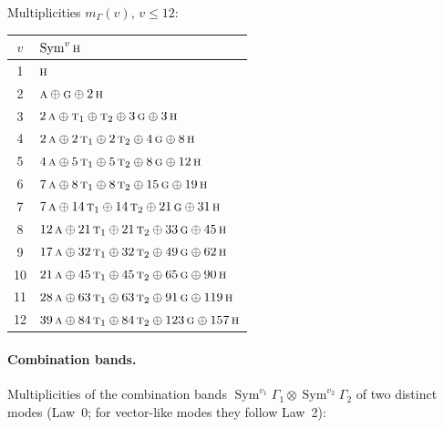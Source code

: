 \documentclass[11pt]{article}
\newcommand{\irr}[1]{\text{\normalfont\scshape #1}}
\begin{document}
Multiplicities $m_\Gamma(v)$, $v\le12$:
\begin{longtable}{c l}\hline $v$ & $\operatorname{Sym}^{v}\irr{h}$\\ \hline\endhead
1 & $\irr{h}$\\
2 & $\irr{a}\oplus \irr{g}\oplus 2\,\irr{h}$\\
3 & $2\,\irr{a}\oplus \irr{t}_{1}\oplus \irr{t}_{2}\oplus 3\,\irr{g}\oplus 3\,\irr{h}$\\
4 & $2\,\irr{a}\oplus 2\,\irr{t}_{1}\oplus 2\,\irr{t}_{2}\oplus 4\,\irr{g}\oplus 8\,\irr{h}$\\
5 & $4\,\irr{a}\oplus 5\,\irr{t}_{1}\oplus 5\,\irr{t}_{2}\oplus 8\,\irr{g}\oplus 12\,\irr{h}$\\
6 & $7\,\irr{a}\oplus 8\,\irr{t}_{1}\oplus 8\,\irr{t}_{2}\oplus 15\,\irr{g}\oplus 19\,\irr{h}$\\
7 & $7\,\irr{a}\oplus 14\,\irr{t}_{1}\oplus 14\,\irr{t}_{2}\oplus 21\,\irr{g}\oplus 31\,\irr{h}$\\
8 & $12\,\irr{a}\oplus 21\,\irr{t}_{1}\oplus 21\,\irr{t}_{2}\oplus 33\,\irr{g}\oplus 45\,\irr{h}$\\
9 & $17\,\irr{a}\oplus 32\,\irr{t}_{1}\oplus 32\,\irr{t}_{2}\oplus 49\,\irr{g}\oplus 62\,\irr{h}$\\
10 & $21\,\irr{a}\oplus 45\,\irr{t}_{1}\oplus 45\,\irr{t}_{2}\oplus 65\,\irr{g}\oplus 90\,\irr{h}$\\
11 & $28\,\irr{a}\oplus 63\,\irr{t}_{1}\oplus 63\,\irr{t}_{2}\oplus 91\,\irr{g}\oplus 119\,\irr{h}$\\
12 & $39\,\irr{a}\oplus 84\,\irr{t}_{1}\oplus 84\,\irr{t}_{2}\oplus 123\,\irr{g}\oplus 157\,\irr{h}$\\
\hline\end{longtable}

\paragraph{Combination bands.}

Multiplicities of the combination bands $\operatorname{Sym}^{v_1}\Gamma_1\otimes\operatorname{Sym}^{v_2}\Gamma_2$ of two distinct modes (Law~0; for vector-like modes they follow Law~2):
\end{document}
